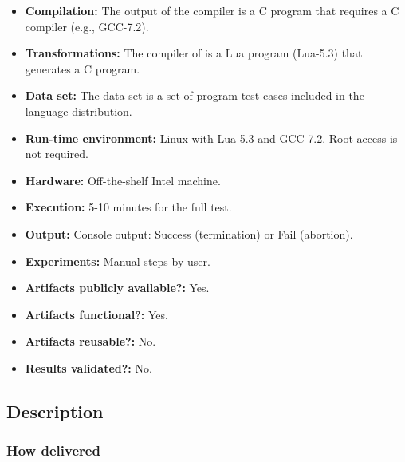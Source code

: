 {\small
\begin{itemize}
  \item {\bf Compilation: } The output of the \CEU compiler is a C program that requires a C compiler (e.g., GCC-7.2).
  \item {\bf Transformations: } The compiler of \CEU is a Lua program (Lua-5.3) that generates a C program.
  \item {\bf Data set: } The data set is a set of program test cases included in the language distribution.
  \item {\bf Run-time environment: } Linux with Lua-5.3 and GCC-7.2. Root access is not required.
  \item {\bf Hardware: } Off-the-shelf Intel machine.
  \item {\bf Execution: } 5-10 minutes for the full test.
  \item {\bf Output: } Console output: Success (termination) or Fail (abortion).
  \item {\bf Experiments: } Manual steps by user.
\end{itemize}

\begin{itemize}
  \item {\bf Artifacts publicly available?:} Yes.
  \item {\bf Artifacts functional?:} Yes.
  \item {\bf Artifacts reusable?:} No.
  \item {\bf Results validated?:} No.
\end{itemize}

\subsection{Description}

\subsubsection{How delivered}

}
